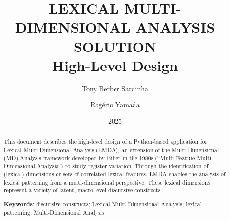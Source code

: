 \title{
    \LARGE \MakeUppercase{Lexical Multi-Dimensional Analysis Solution} \\
    \Large High-Level Design
}
\author{Tony Berber Sardinha \and Rogério Yamada} %
\date{2025}
\maketitle
\begin{abstract}
    This document describes the high-level design of a Python-based application for Lexical Multi-Dimensional Analysis (LMDA), an extension of the Multi-Dimensional (MD) Analysis framework developed by Biber in the 1980s (``Multi-Feature Multi-Dimensional Analysis'') to study register variation. Through the identification of (lexical) dimensions or sets of correlated lexical features, LMDA enables the analysis of lexical patterning from a multi-dimensional perspective. These lexical dimensions represent a variety of latent, macro-level discursive constructs. \citep{berbersardinhaLexicalMultiDimensionalAnalysis2025}

    \vspace{1em}
    \textbf{Keywords}: discursive constructs; Lexical Multi-Dimensional Analysis; lexical patterning; Multi-Dimensional Analysis
\end{abstract}

\listoffigures
\tableofcontents
